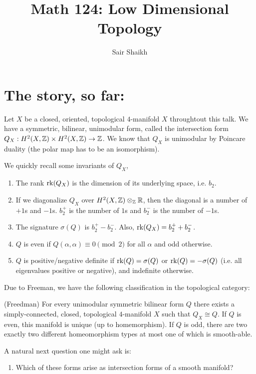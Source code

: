 \documentclass[12pt]{amsart}
\begin{document}
\title{Math 124: Low Dimensional Topology}

\author{Sair Shaikh}
\maketitle

\section{The story, so far:}

Let $X$ be a closed, oriented, topological $4$-manifold $X$ throughtout this talk. We have a symmetric, bilinear, unimodular form, called the intersection form $Q_X: H^2(X, \mathbb Z) \times H^2(X, \mathbb Z) \to \mathbb Z$. We know that $Q_X$ is unimodular by Poincare duality (the polar map has to be an isomorphism). 

We quickly recall some invariants of $Q_X$, 
\begin{enumerate}
    \item The rank $\operatorname{rk}(Q_X)$ is the dimension of its underlying space, i.e. $b_2$.  
    \item If we diagonalize $Q_X$ over $H^2(X, \mathbb Z) \otimes_\mathbb Z \mathbb R$, then the diagonal is a number of $+1$s and $-1$s. $b_2^+$ is the number of $1$s and $b_2^-$ is the number of $-1$s. 
    \item The signature $\sigma(Q)$ is $b_2^+ - b_2^-$. Also, $\operatorname{rk}(Q_X) = b_2^+ + b_2^-$. 
    \item $Q$ is even if $Q(\alpha, \alpha) \equiv 0 \pmod{2}$ for all $\alpha$ and odd otherwise.
    \item $Q$ is positive/negative definite if $\operatorname{rk}(Q) = \sigma(Q)$ or $\operatorname{rk}(Q) = -\sigma(Q)$ (i.e. all eigenvalues positive or negative), and indefinite otherwise.
\end{enumerate}


Due to Freeman, we have the following classification in the topological category: 
\begin{theorem}(Freedman)
    For every unimodular symmetric bilinear form $Q$ there exists a simply-connected, closed, topological $4$-manifold $X$ such that $Q_X \cong Q$. If $Q$ is even, this manifold is unique (up to homemorphism). If $Q$ is odd, there are two exactly two different homeomorphism types at most one of which is smooth-able. 
\end{theorem}

A natural next question one might ask is: 
\begin{enumerate}
    \item[Q.] Which of these forms arise as intersection forms of a smooth manifold?
\end{enumerate}
\end{document}
